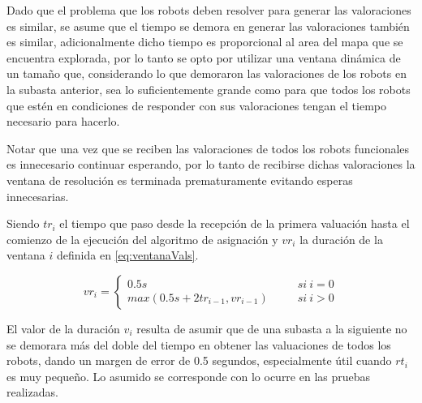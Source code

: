 Dado que el problema que los robots deben resolver para generar las valoraciones es
similar, se asume que el tiempo se demora en generar las valoraciones también
es similar, adicionalmente dicho tiempo es proporcional al area del
mapa que se encuentra explorada, por lo tanto se opto por utilizar una ventana
dinámica de un tamaño que, considerando lo que demoraron las valoraciones de
los robots en la subasta anterior, sea lo suficientemente grande como para que
todos los robots que estén en condiciones de responder con sus valoraciones
tengan el tiempo necesario para hacerlo.

Notar que una vez que se reciben las valoraciones de todos los robots
funcionales es innecesario continuar esperando, por lo tanto de recibirse
dichas valoraciones la ventana de resolución es terminada prematuramente
evitando esperas innecesarias.

Siendo $tr_i$ el tiempo que paso desde la recepción de la primera valuación
hasta el comienzo de la ejecución del algoritmo de asignación y $vr_i$ la
duración de la ventana $i$ definida en \ref{eq:ventanaVals}.

\begin{equation} 
  vr_i = 
  \left \{ 
    \begin{aligned}
      0.5s                            \ \ \ \ \ \ \ \ & si\ i = 0\\ 
      max(0.5s + 2tr_{i-1}, vr_{i-1}) \ \ \ \ \ \ \ \ & si\ i > 0
    \end{aligned}
  \right .
  \label{eq:ventanaVals}
\end{equation}

El valor de la duración $v_i$ resulta de asumir que de una subasta a la
siguiente no se demorara más del doble del tiempo en obtener las valuaciones de
todos los robots, dando un margen de error de 0.5 segundos, especialmente útil
cuando $rt_i$ es muy pequeño. Lo asumido se corresponde con lo ocurre en las
pruebas realizadas.




